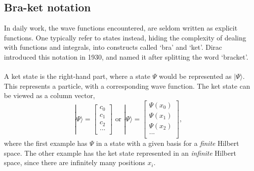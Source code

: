 \subsection{Bra-ket notation}
In daily work, the wave functions encountered, are seldom written as explicit functions.
One typically refer to states instead, hiding the complexity of dealing with
functions and integrals, into constructs called `bra' and `ket'.
Dirac introduced this notation in 1930, and named it after splitting the word
`bracket'\cite{bracket}.

\paragraph*{}
A ket state is the right-hand part, where a state $\Psi$ would be represented as $|\Psi \rangle$.
This represents a particle, with a corresponding
wave function.
The ket state can be viewed as a column vector,
\begin{equation}
\label{eq:qm:bra}
|\Psi \rangle = 
\begin{bmatrix}
c_0 \\
c_1 \\
c_2 \\
... \\
\end{bmatrix}
\textrm{ or }
|\Psi \rangle =
\begin{bmatrix}
\Psi(x_0) \\
\Psi(x_1) \\
\Psi(x_2) \\
... \\
\end{bmatrix} ,
\end{equation}
where the first example has $\Psi$ in a state with a given basis for a \textit{finite} Hilbert space.
The other example has the ket state represented in an \textit{infinite} Hilbert space, since there are
infinitely many positions $x_i$.

